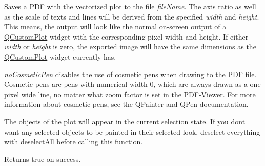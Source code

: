 Saves a P\+DF with the vectorized plot to the file {\itshape file\+Name}. The axis ratio as well as the scale of texts and lines will be derived from the specified {\itshape width} and {\itshape height}. This means, the output will look like the normal on-\/screen output of a \mbox{\hyperlink{class_q_custom_plot}{Q\+Custom\+Plot}} widget with the corresponding pixel width and height. If either {\itshape width} or {\itshape height} is zero, the exported image will have the same dimensions as the \mbox{\hyperlink{class_q_custom_plot}{Q\+Custom\+Plot}} widget currently has.

{\itshape no\+Cosmetic\+Pen} disables the use of cosmetic pens when drawing to the P\+DF file. Cosmetic pens are pens with numerical width 0, which are always drawn as a one pixel wide line, no matter what zoom factor is set in the P\+D\+F-\/\+Viewer. For more information about cosmetic pens, see the Q\+Painter and Q\+Pen documentation.

The objects of the plot will appear in the current selection state. If you don\textquotesingle{}t want any selected objects to be painted in their selected look, deselect everything with \mbox{\hyperlink{class_q_custom_plot_a9d4808ab925b003054085246c92a257c}{deselect\+All}} before calling this function.

Returns true on success.

